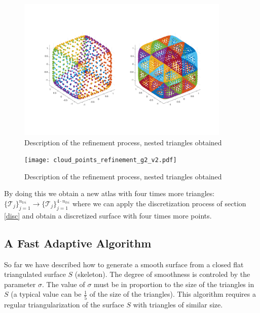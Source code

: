 \documentclass[11pt]{article}
\numberwithin{equation}{section}
\begin{document}
\begin{figure}[H]
\begin{center}
\includegraphics[width=4in]{cloud_points_refinement_v2.pdf}%
\end{center}
\caption{Description of the refinement process, nested triangles obtained}
\label{refinement2}
\end{figure}


\begin{figure}[H]
\begin{center}
\texttt{[image: cloud\_points\_refinement\_g2\_v2.pdf]}%
\end{center}
\caption{Description of the refinement process, nested triangles obtained}
\label{refinement3}
\end{figure}


By doing this we obtain a new atlas with four times more triangles:
$\{\mathcal{T}_j\}_{j=1}^{n_{tri}}\rightarrow
\{\mathcal{T}_j\}_{j=1}^{4\cdot n_{tri}}$ where we can apply the
discretization process of section \ref{disc} and obtain a discretized
surface with four times more points.








\subsection{A Fast Adaptive Algorithm}
\label{sec:fast-adap}


So far we have described how to generate a smooth surface from a closed flat triangulated surface $\mathit{S}$ (skeleton). The degree of smoothness is controled by the parameter $\sigma$. The value of $\sigma$ must be in proportion to the size of the triangles in $\mathit{S}$ (a typical value can be $\frac{1}{5}$ of the size of the triangles). This algorithm requires a regular triangularization of the surface $\mathit{S}$ with triangles of similar size.
\end{document}

